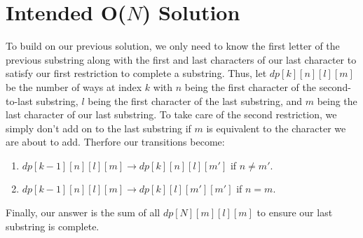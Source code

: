 \documentclass{article}
\begin{document}
\section{Intended O($N$) Solution}
    \hspace{1em} \quad To build on our previous solution, we only need to know the first letter of the previous substring along with the first and last characters of our last character to satisfy our first restriction to complete a substring. Thus, let $dp[k][n][l][m]$ be the number of ways at index $k$ with $n$ being the first character of the second-to-last substring, $l$ being the first character of the last substring, and $m$ being the last character of our last substring. To take care of the second restriction, we simply don't add on to the last substring if $m$ is equivalent to the character we are about to add. Therfore our transitions become:
        \begin{enumerate}
        \item $dp[k-1][n][l][m] \rightarrow dp[k][n][l][m']$ if $n \neq m'$.
        \item $dp[k-1][n][l][m] \rightarrow dp[k][l][m'][m']$ if $n = m$.
    \end{enumerate}
    Finally, our answer is the sum of all $dp[N][m][l][m]$ to ensure our last substring is complete.
\end{document}
